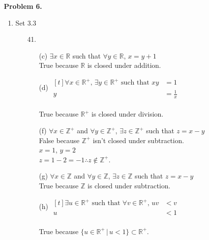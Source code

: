 \documentclass[letterpaper,fleqn]{article}
\begin{document}
\begin{enumerate}
\begin{enumerate}[]
\begin{enumerate}
			\end{enumerate}
		\end{enumerate}
		
		\item [] \textbf{Problem 6.}
		\begin{enumerate}[]
			\item Set 3.3
			\begin{enumerate}
				\item [41.] \quad
				\begin{enumerate}
					\item [(c)]
					$\exists x \in \mathbb{R}$ such that $\forall y \in \mathbb{R}$, $x=y+1$ \\
					True because $\mathbb{R}$ is closed under addition.
					
					\item [(d)]
					$\begin{aligned}[t]
						\forall x \in \mathbb{R}^+ \text{, } \exists y \in \mathbb{R}^+ \text{ such that } xy &=1 \\
						y &=\frac{1}{x}
					\end{aligned}$ \\\\
					True because $\mathbb{R}^+$ is closed under division.
					
					\item [(f)]
					$\forall x \in \mathbb{Z}^+$ and $\forall y \in \mathbb{Z}^+$, $\exists z \in \mathbb{Z}^+$ such that $z=x-y$ \\
					False because $\mathbb{Z}^+$ isn't closed under subtraction. \\
					$x=1$, $y=2$ \\
					$z=1-2=-1 \therefore z \not\in \mathbb{Z}^+$.
					
					\item [(g)]
					$\forall x \in \mathbb{Z}$ and $\forall y \in \mathbb{Z}$, $\exists z \in \mathbb{Z}$ such that $z=x-y$ \\
					True because $\mathbb{Z}$ is closed under subtraction.
					
					\item [(h)]
					$\begin{aligned}[t]
						\exists u \in \mathbb{R}^+ \text{ such that } \forall v \in \mathbb{R}^+ \text{, } uv &<v \\
						u &< 1
					\end{aligned}$ \\\\
					True because $\{u \in \mathbb{R}^+ \,|\, u<1\} \subset \mathbb{R}^+$.
					

\end{enumerate}
\end{enumerate}
\end{enumerate}
\end{enumerate}
\end{document}
